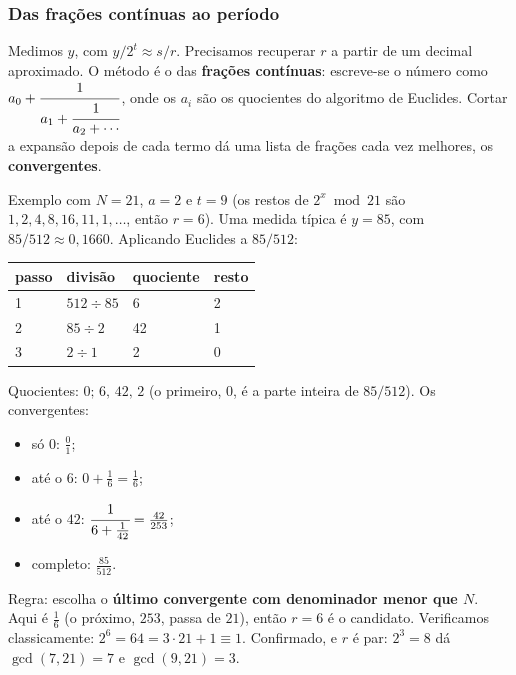 \subsubsection{Das frações contínuas ao período}\label{das-frauxe7uxf5es-contuxednuas-ao-peruxedodo}

Medimos \(y\), com \(y/2^t\approx s/r\). Precisamos recuperar \(r\) a partir de um decimal aproximado. O método é o das \textbf{frações contínuas}: escreve-se o número como \(a_0+\cfrac{1}{a_1+\cfrac1{a_2+\cdots}}\), onde os \(a_i\) são os quocientes do algoritmo de Euclides. Cortar a expansão depois de cada termo dá uma lista de frações cada vez melhores, os \textbf{convergentes}.

Exemplo com \(N=21\), \(a=2\) e \(t=9\) (os restos de \(2^x \bmod 21\) são \(1,2,4,8,16,11,1,\dots\), então \(r=6\)). Uma medida típica é \(y=85\), com \(85/512\approx0{,}1660\). Aplicando Euclides a \(85/512\):

\begin{center}\begin{tabular}{llll}
\hline
passo & divisão & quociente & resto \\
\hline

\hline

1 & \(512 \div 85\) & 6 & 2 \\
2 & \(85 \div 2\) & 42 & 1 \\
3 & \(2 \div 1\) & 2 & 0 \\
\end{tabular}\end{center}

Quocientes: \(0;\,6,\,42,\,2\) (o primeiro, \(0\), é a parte inteira de \(85/512\)). Os convergentes:

\begin{itemize}
\tightlist
\item
  só \(0\): \(\tfrac01\);
\item
  até o \(6\): \(0+\tfrac16=\tfrac16\);
\item
  até o \(42\): \(\cfrac{1}{6+\frac1{42}}=\tfrac{42}{253}\);
\item
  completo: \(\tfrac{85}{512}\).
\end{itemize}

Regra: escolha o \textbf{último convergente com denominador menor que \(N\)}. Aqui é \(\tfrac16\) (o próximo, \(253\), passa de \(21\)), então \(r=6\) é o candidato. Verificamos classicamente: \(2^6=64=3\cdot21+1\equiv1\). Confirmado, e \(r\) é par: \(2^3=8\) dá \(\gcd(7,21)=7\) e \(\gcd(9,21)=3\).

